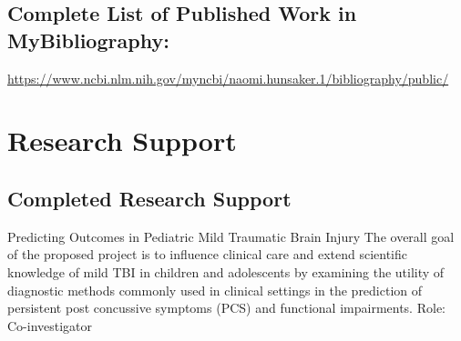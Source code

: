 \documentclass{nihbiosketch}
\begin{document}
\subsection*{Complete List of Published Work in MyBibliography:} 
\url{https://www.ncbi.nlm.nih.gov/myncbi/naomi.hunsaker.1/bibliography/public/}



\section{Research Support}







\subsection*{Completed Research Support}

{Predicting Outcomes in Pediatric Mild Traumatic Brain Injury}
{The overall goal of the proposed project is to influence clinical care and extend scientific knowledge of mild TBI in children and adolescents by examining the utility of diagnostic methods commonly used in clinical settings in the prediction of persistent post concussive symptoms (PCS) and functional impairments.}
{Role: Co-investigator}
\end{document}
